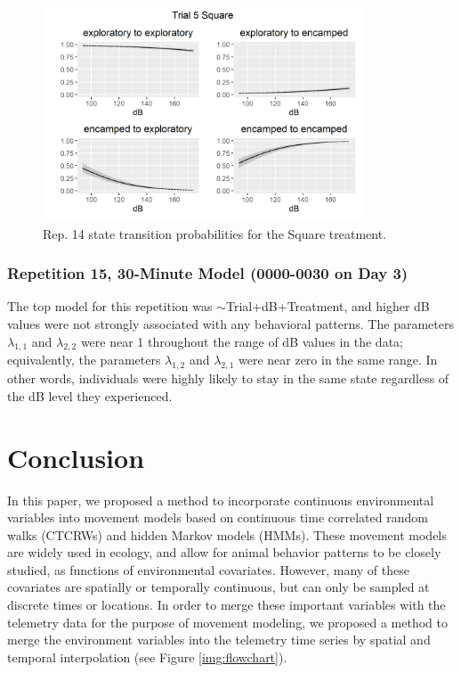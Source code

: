 \documentclass[12pt]{article}
\begin{document}
	\begin{figure}
		\centering
		\includegraphics[width=0.85\textwidth]{trans_rep_14_trial_5_Square.png}
		\caption{Rep. 14 state transition probabilities for the Square treatment.}
		\label{img:rep5_30min_trans_tmnt}
	\end{figure}
	
	\subsubsection{Repetition 15, 30-Minute Model (0000-0030 on Day 3)}
	
	The top model for this repetition was $\sim$Trial+dB+Treatment, and higher dB values were not strongly associated with any behavioral patterns. The parameters $\lambda_{1, 1}$ and $\lambda_{2, 2}$ were near 1 throughout the range of dB values in the data; equivalently, the parameters $\lambda_{1, 2}$ and $\lambda_{2, 1}$ were near zero in the same range. In other words, individuals were highly likely to stay in the same state regardless of the dB level they experienced.
	
	\section{Conclusion} \label{sec:conclusion}
	
	In this paper, we proposed a method to incorporate continuous environmental variables into movement models based on continuous time correlated random walks (CTCRWs) and hidden Markov models (HMMs). These movement models are widely used in ecology, and allow for animal behavior patterns to be closely studied, as functions of environmental covariates. However, many of these covariates are spatially or temporally continuous, but can only be sampled at discrete times or locations. In order to merge these important variables with the telemetry data for the purpose of movement modeling, we proposed a method to merge the environment variables into the telemetry time series by spatial and temporal interpolation (see Figure \ref{img:flowchart}).
	
\end{document}
